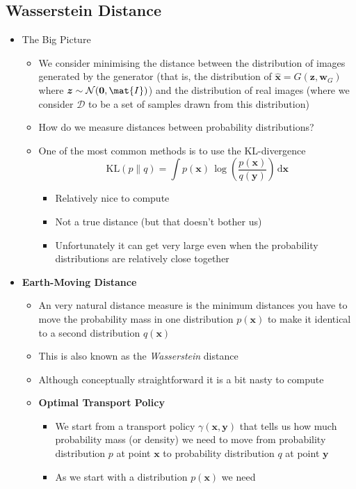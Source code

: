 \documentclass[11pt]{article}
\newcommand{\logg}[1]{\log\!\left( #1 \right)}
\newcommand{\dd}{\mathrm{d}}
\begin{document}
\subsection{Wasserstein Distance}
\label{sec:orgb233114}
\begin{itemize}
\item The Big Picture
\begin{itemize}
\item We consider minimising the distance between the distribution of
images generated by the generator (that is, the distribution of
\(\hat{\bm{x}} = G(\bm{z}, \bm{w}_G)\) where
\(\bm{z} \sim \mathcal{N}(\bm{0}, \mat{I})\)) and the distribution of real
images (where we consider \(\mathcal{D}\) to be a set of samples
drawn from this distribution)
\item How do we measure distances between probability distributions?
\item One of the most common methods is to use the KL-divergence
$$ \mathrm{KL}(p\|q) = \int p(\bm{x}) \,
	\logg{\frac{p(\bm{x})}{q(\bm{y})}} \, \dd \bm{x} $$
\begin{itemize}
\item Relatively nice to compute
\item Not a true distance (but that doesn't bother us)
\item Unfortunately it can get very large even when the probability
distributions are relatively close together
\end{itemize}
\end{itemize}
\item \textbf{Earth-Moving Distance}
\begin{itemize}
\item An very natural distance measure is the minimum distances you
have to move the probability mass in one distribution
\(p(\bm{x})\) to make it identical to a second distribution \(q(\bm{x})\)
\item This is also known as the \emph{Wasserstein} distance
\item Although conceptually straightforward it is a bit nasty to compute
\item \textbf{Optimal Transport Policy}
\begin{itemize}
\item We start from a transport policy \(\gamma(\bm{x},\bm{y})\) that
tells us how much probability mass (or density) we need to move
from probability distribution \(p\) at point \(\bm{x}\) to
probability distribution \(q\) at point \(\bm{y}\)
\item As we start with a distribution \(p(\bm{x})\) we need

\end{itemize}
\end{itemize}
\end{itemize}
\end{document}
